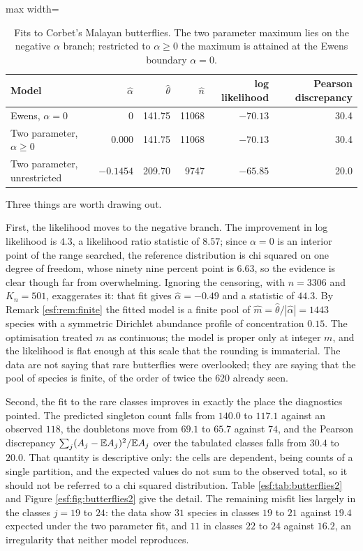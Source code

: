 \begin{table}[htbp]
\centering
\caption{Fits to Corbet's Malayan butterflies. The two parameter maximum lies on the
negative $\alpha$ branch; restricted to $\alpha \ge 0$ the maximum is attained at the
Ewens boundary $\alpha = 0$.}
\label{esf:tab:fits}
\begin{adjustbox}{max width=\textwidth}
\begin{tabular}{lrrrrr}
\toprule
Model & $\hat\alpha$ & $\hat\theta$ & $\hat n$ & log likelihood & Pearson discrepancy \\
\midrule
Ewens, $\alpha = 0$        & 0      & 141.75 & 11068 & $-70.13$ & 30.4 \\
Two parameter, $\alpha \ge 0$ & 0.000  & 141.75 & 11068 & $-70.13$ & 30.4 \\
Two parameter, unrestricted  & $-0.1454$ & 209.70 & 9747 & $-65.85$  & 20.0 \\
\bottomrule
\end{tabular}
\end{adjustbox}
\end{table}

Three things are worth drawing out.

First, the likelihood moves to the negative branch. The improvement in log
likelihood is $4.3$, a likelihood ratio statistic of $8.57$; since $\alpha = 0$ is an interior point of the range searched, the reference distribution is chi squared on one degree of freedom, whose ninety nine percent point is $6.63$, so the evidence is clear though far from overwhelming. Ignoring the censoring, with $n = 3306$ and $K_n = 501$, exaggerates it: that fit gives $\hat\alpha = -0.49$ and a statistic of $44.3$. By
Remark \ref{esf:rem:finite} the fitted model is a finite pool of
$\hat m = \hat\theta / |\hat\alpha| = 1443$ species with a symmetric Dirichlet
abundance profile of concentration $0.15$. The optimisation treated $m$ as continuous; the model is proper only at integer $m$, and the likelihood is flat
enough at this scale that the rounding is immaterial. The data are not saying that rare
butterflies were overlooked; they are saying that the pool of species is finite, of the order of twice the $620$ already seen.

Second, the fit to the rare classes improves in exactly the place the diagnostics
pointed. The predicted singleton count falls from $140.0$ to $117.1$ against an
observed $118$, the doubletons move from $69.1$ to $65.7$ against $74$, and the
Pearson discrepancy $\sum_j (A_j - \mathbb{E} A_j)^2 / \mathbb{E} A_j$ over the tabulated classes
falls from $30.4$ to $20.0$. That quantity is descriptive only: the cells are
dependent, being counts of a single partition, and the expected values do not sum to
the observed total, so it should not be referred to a chi squared distribution. Table
\ref{esf:tab:butterflies2} and Figure \ref{esf:fig:butterflies2} give the detail. The
remaining misfit lies largely in the classes $j = 19$ to $24$: the data show $31$ species in classes $19$ to $21$ against $19.4$ expected under the two parameter fit, and $11$ in classes $22$ to $24$ against $16.2$, an irregularity that neither model reproduces.

